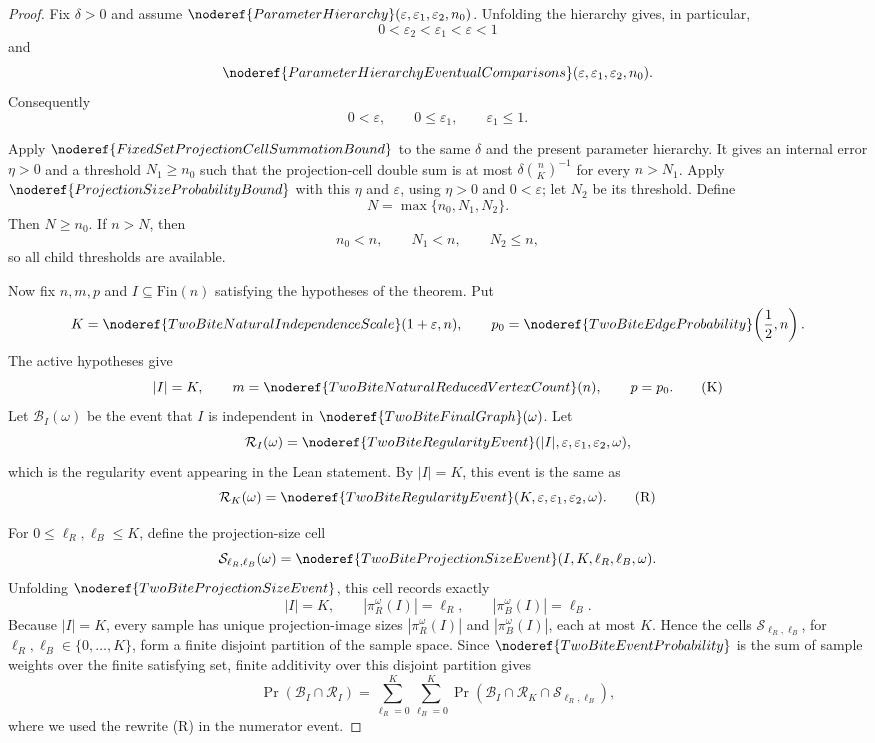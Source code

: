 \begin{proof}
Fix \(\delta>0\) and assume
\(\noderef{ParameterHierarchy}(\varepsilon,\varepsilon_1,\varepsilon_2,n_0)\).
Unfolding the hierarchy gives, in particular,
\[
0<\varepsilon_2<\varepsilon_1<\varepsilon<1
\]
and
\[
\noderef{ParameterHierarchyEventualComparisons}
(\varepsilon,\varepsilon_1,\varepsilon_2,n_0).
\]
Consequently
\[
0<\varepsilon,\qquad 0\le\varepsilon_1,\qquad \varepsilon_1\le1. \tag{H}
\]

Apply \(\noderef{FixedSetProjectionCellSummationBound}\) to the same
\(\delta\) and the present parameter hierarchy.  It gives an internal error
\(\eta>0\) and a threshold \(N_1\ge n_0\) such that the projection-cell double
sum is at most \(\delta\binom nK^{-1}\) for every \(n>N_1\).  Apply
\(\noderef{ProjectionSizeProbabilityBound}\) with this \(\eta\) and
\(\varepsilon\), using \(\eta>0\) and \(0<\varepsilon\); let \(N_2\) be its
threshold.  Define
\[
N=\max\{n_0,N_1,N_2\}.
\]
Then \(N\ge n_0\).  If \(n>N\), then
\[
n_0<n,\qquad N_1<n,\qquad N_2\le n, \tag{T}
\]
so all child thresholds are available.

Now fix \(n,m,p\) and \(I\subseteq\mathrm{Fin}(n)\) satisfying the hypotheses
of the theorem.  Put
\[
K=\noderef{TwoBiteNaturalIndependenceScale}(1+\varepsilon,n),
\qquad
p_0=\noderef{TwoBiteEdgeProbability}\!\left(\frac12,n\right).
\]
The active hypotheses give
\[
|I|=K,\qquad m=\noderef{TwoBiteNaturalReducedVertexCount}(n),\qquad p=p_0.
\tag{K}
\]
Let \(\mathcal B_I(\omega)\) be the event that \(I\) is independent in
\(\noderef{TwoBiteFinalGraph}(\omega)\).  Let
\[
\mathcal R_I(\omega)=
\noderef{TwoBiteRegularityEvent}(|I|,\varepsilon,\varepsilon_1,\varepsilon_2,
\omega),
\]
which is the regularity event appearing in the Lean statement.  By \(|I|=K\),
this event is the same as
\[
\mathcal R_K(\omega)=
\noderef{TwoBiteRegularityEvent}(K,\varepsilon,\varepsilon_1,\varepsilon_2,
\omega). \tag{R}
\]

For \(0\le\ell_R,\ell_B\le K\), define the projection-size cell
\[
\mathcal S_{\ell_R,\ell_B}(\omega)=
\noderef{TwoBiteProjectionSizeEvent}(I,K,\ell_R,\ell_B,\omega).
\]
Unfolding \(\noderef{TwoBiteProjectionSizeEvent}\), this cell records exactly
\[
|I|=K,\qquad
|\pi_R^\omega(I)|=\ell_R,\qquad
|\pi_B^\omega(I)|=\ell_B. \tag{S}
\]
Because \(|I|=K\), every sample has unique projection-image sizes
\(|\pi_R^\omega(I)|\) and \(|\pi_B^\omega(I)|\), each at most \(K\).  Hence
the cells \(\mathcal S_{\ell_R,\ell_B}\), for
\(\ell_R,\ell_B\in\{0,\ldots,K\}\), form a finite disjoint partition of the
sample space.  Since
\(\noderef{TwoBiteEventProbability}\) is the sum of sample weights over the
finite satisfying set, finite additivity over this disjoint partition gives
\[
\Pr(\mathcal B_I\cap\mathcal R_I)
=
\sum_{\ell_R=0}^{K}\sum_{\ell_B=0}^{K}
\Pr(\mathcal B_I\cap\mathcal R_K\cap\mathcal S_{\ell_R,\ell_B}),
\tag{1}
\]
where we used the rewrite (R) in the numerator event.


\end{proof}
